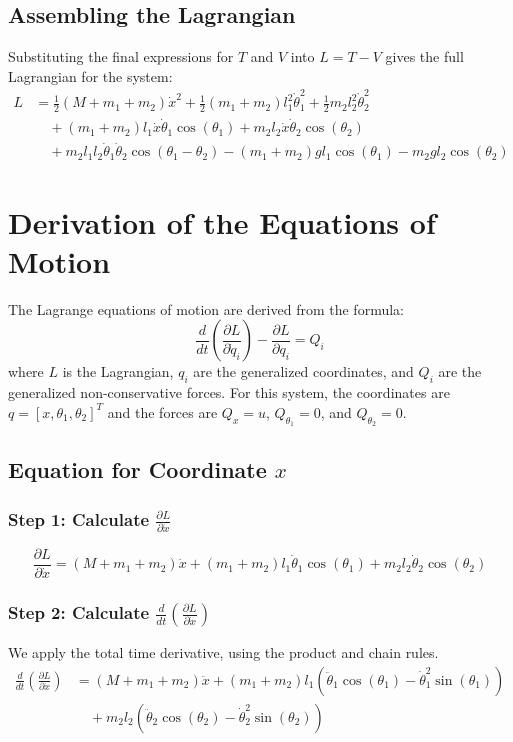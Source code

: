 \documentclass[12pt]{article}
\begin{document}
	\subsection{Assembling the Lagrangian}
	Substituting the final expressions for $T$ and $V$ into $L=T-V$ gives the full Lagrangian for the system:
	\begin{align*}
		L &= \frac{1}{2} (M + m_1 + m_2) \dot{x}^2 + \frac{1}{2} (m_1 + m_2) l_1^2 \dot{\theta}_1^2 + \frac{1}{2} m_2 l_2^2 \dot{\theta}_2^2 \\
		&\quad + (m_1 + m_2) l_1 \dot{x} \dot{\theta}_1 \cos(\theta_1) + m_2 l_2 \dot{x} \dot{\theta}_2 \cos(\theta_2) \\
		&\quad + m_2 l_1 l_2 \dot{\theta}_1 \dot{\theta}_2 \cos(\theta_1 - \theta_2) - (m_1 + m_2) g l_1 \cos(\theta_1) - m_2 g l_2 \cos(\theta_2)
	\end{align*}
	
	\section{Derivation of the Equations of Motion}
	The Lagrange equations of motion are derived from the formula:
	\begin{equation}
		\frac{d}{dt} \left( \frac{\partial L}{\partial \dot{q}_i} \right) - \frac{\partial L}{\partial q_i} = Q_i
	\end{equation}
	where $L$ is the Lagrangian, $q_i$ are the generalized coordinates, and $Q_i$ are the generalized non-conservative forces. For this system, the coordinates are $q = [x, \theta_1, \theta_2]^T$ and the forces are $Q_x = u$, $Q_{\theta_1} = 0$, and $Q_{\theta_2} = 0$.
	
	\subsection{Equation for Coordinate $x$}
	
	\subsubsection*{Step 1: Calculate $\frac{\partial L}{\partial \dot{x}}$}
	\[
	\frac{\partial L}{\partial \dot{x}} = (M + m_1 + m_2) \dot{x} + (m_1 + m_2) l_1 \dot{\theta}_1 \cos(\theta_1) + m_2 l_2 \dot{\theta}_2 \cos(\theta_2)
	\]
	
	\subsubsection*{Step 2: Calculate $\frac{d}{dt} \left( \frac{\partial L}{\partial \dot{x}} \right)$}
	We apply the total time derivative, using the product and chain rules.
	\begin{align*}
		\frac{d}{dt} \left( \frac{\partial L}{\partial \dot{x}} \right) &= (M + m_1 + m_2) \ddot{x} + (m_1 + m_2) l_1 \left( \ddot{\theta}_1 \cos(\theta_1) - \dot{\theta}_1^2 \sin(\theta_1) \right) \\
		&\quad + m_2 l_2 \left( \ddot{\theta}_2 \cos(\theta_2) - \dot{\theta}_2^2 \sin(\theta_2) \right)
	\end{align*}
	
\end{document}
